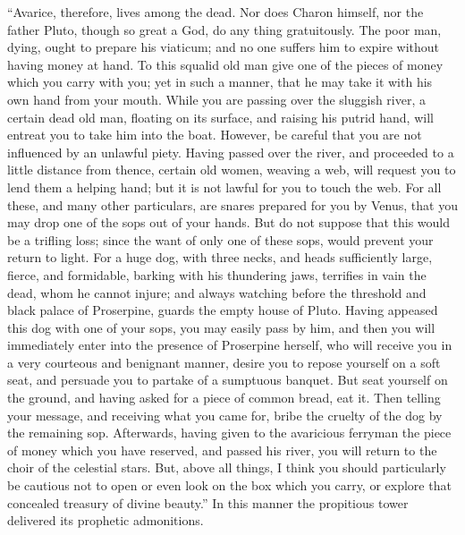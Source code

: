 \documentclass{article}
\begin{document}
``Avarice, therefore, lives among the dead. Nor does Charon himself, nor the
father Pluto, though so great a God, do any thing gratuitously. The poor man,
dying, ought to prepare his viaticum; and no one suffers him to expire without
having money at hand. To this squalid old man give one of the pieces of money
which you carry with you; yet in such a manner, that he may take it with his
own hand from your mouth. While you are passing over the sluggish river, a
certain dead old man, floating on its surface, and raising his putrid hand,
will entreat you to take him into the boat. However, be careful that you are
not influenced by an unlawful piety. Having passed over the river, and
proceeded to a little distance from thence, certain old women, weaving a web,
will request you to lend them a helping hand; but it is not lawful for you to
touch the web. For all these, and many other particulars, are snares prepared
for you by Venus, that you may drop one of the sops out of your hands. But do
not suppose that this would be a trifling loss; since the want of only one of
these sops, would prevent your return to light. For a huge dog, with three
necks, and heads sufficiently large, fierce, and formidable, barking with his
thundering jaws, terrifies in vain the dead, whom he cannot injure; and always
watching before the threshold and black palace of Proserpine, guards the empty
house of Pluto. Having appeased this dog with one of your sops, you may easily
pass by him, and then you will immediately enter into the presence of
Proserpine herself, who will receive you in a very courteous and benignant
manner, desire you to repose yourself on a soft seat, and persuade you to
partake of a sumptuous banquet. But seat yourself on the ground, and having
asked for a piece of common bread, eat it. Then telling your message, and
receiving what you came for, bribe the cruelty of the dog by the remaining sop.
Afterwards, having given to the avaricious ferryman the piece of money which
you have reserved, and passed his river, you will return to the choir of the
celestial stars. But, above all things, I think you should particularly be
cautious not to open or even look on the box which you carry, or explore that
concealed treasury of divine beauty.'' In this manner the propitious tower
delivered its prophetic admonitions.
\end{document}
